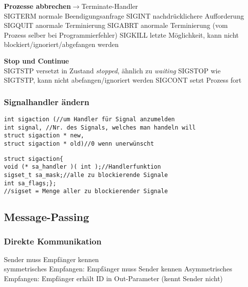 \textbf{Prozesse abbrechen}$\rightarrow$Terminate-Handler\\
SIGTERM normale Beendigungsanfrage 
SIGINT nachdrücklichere Aufforderung 
SIGQUIT anormale Terminierung 
SIGABRT anormale Terminierung (vom Prozess selber bei Programmierfehler)
SIGKILL letzte Möglichkeit, kann nicht blockiert/ignoriert/abgefangen werden

\textbf{Stop und Continue}\\
SIGTSTP versetzt in Zustand \textit{stopped}, ähnlich zu \textit{waiting}  
SIGSTOP wie SIGTSTP, kann nicht abefangen/ignoriert werden
SIGCONT setzt Prozess fort


\subsubsection{Signalhandler ändern}
\begin{verbatim}
int sigaction (//um Handler für Signal anzumelden
int signal, //Nr. des Signals, welches man handeln will
struct sigaction * new, 
struct sigaction * old)//0 wenn unerwünscht
\end{verbatim}
\begin{verbatim}
struct sigaction{
void (* sa_handler )( int );//Handlerfunktion
sigset_t sa_mask;//alle zu blockierende Signale
int sa_flags;};
//sigset = Menge aller zu blockierender Signale
\end{verbatim}

\subsection{Message-Passing}

\subsubsection{Direkte Kommunikation}
Sender muss Empfänger kennen \\
symmetrisches Empfangen: Empfänger muss Sender kennen %
Asymmetrisches Empfangen: Empfänger erhält ID in Out-Parameter (kennt Sender nicht) %

